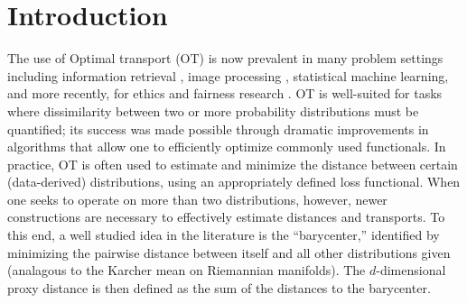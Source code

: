 \section{Introduction}
The use of Optimal transport (OT) is now prevalent in many problem settings including information retrieval \citep{balikas2018cross,yurochkin2019hierarchical}, image processing \citep{otip}, statistical machine learning, and more recently, for ethics and fairness research \citep{kwegyiraggrey2021relative}. 
OT is well-suited for tasks where dissimilarity between two or more probability distributions must be quantified; 
its success was made possible through dramatic improvements in algorithms \citep{cuturi2013sinkhorn,solomon2015convolutional} that allow one to efficiently optimize commonly used functionals.
In practice, OT is often used to estimate and minimize the 
distance between certain (data-derived) distributions, 
using an appropriately defined loss functional. %
When one seeks to operate on more than two distributions, however, newer constructions are necessary to effectively estimate distances and transports.
To this end, a well studied idea in the literature is the ``barycenter,''
identified by minimizing the pairwise distance between itself and all other distributions given (analagous to the Karcher mean on Riemannian manifolds). 
The $d$-dimensional proxy distance is then defined as the sum of the distances to the barycenter.



